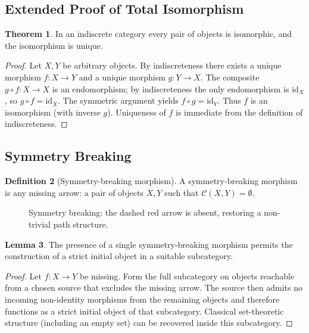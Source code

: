 \documentclass[11pt,a4paper]{article}
\theoremstyle{definition}
\newtheorem{theorem}{Theorem}[section]
\newtheorem{lemma}[theorem]{Lemma}
\newtheorem{definition}[theorem]{Definition}
\begin{document}
\subsection{Extended Proof of Total Isomorphism}
\begin{theorem}
In an indiscrete category every pair of objects is isomorphic, and the isomorphism is unique.
\end{theorem}
\begin{proof}
Let \(X,Y\) be arbitrary objects. By indiscreteness there exists a unique morphism \(f:X\to Y\) and a unique morphism \(g:Y\to X\). The composite \(g\circ f:X\to X\) is an endomorphism; by indiscreteness the only endomorphism is \(\mathrm{id}_X\), so \(g\circ f=\mathrm{id}_X\). The symmetric argument yields \(f\circ g=\mathrm{id}_Y\). Thus \(f\) is an isomorphism (with inverse \(g\)). Uniqueness of \(f\) is immediate from the definition of indiscreteness.
\end{proof}

\subsection{Symmetry Breaking}
\begin{definition}[Symmetry-breaking morphism]
A symmetry-breaking morphism is any missing arrow: a pair of objects \(X,Y\) such that \(\mathcal{C}(X,Y)=\emptyset\).
\end{definition}

\begin{figure}[h]
\centering
{}
\caption{Symmetry breaking: the dashed red arrow is absent, restoring a non-trivial path structure.}
\end{figure}

\begin{lemma}
The presence of a single symmetry-breaking morphism permits the construction of a strict initial object in a suitable subcategory.
\end{lemma}
\begin{proof}
Let \(f:X\to Y\) be missing. Form the full subcategory on objects reachable from a chosen source that excludes the missing arrow. The source then admits no incoming non-identity morphisms from the remaining objects and therefore functions as a strict initial object of that subcategory. Classical set-theoretic structure (including an empty set) can be recovered inside this subcategory.
\end{proof}
\end{document}

